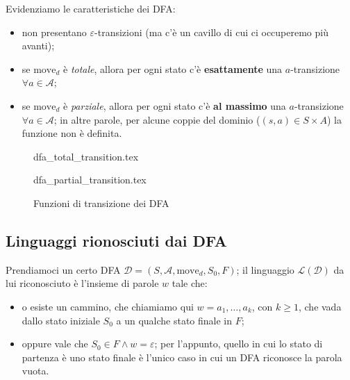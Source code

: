 \documentclass[class=book, crop=false, oneside, 12pt]{standalone}
\begin{document}
Evidenziamo le caratteristiche dei DFA:

\begin{itemize}
    \item non presentano \(\varepsilon\)-transizioni (ma c'è un cavillo di cui ci occuperemo più avanti);
    \item se \(\textrm{move}_d\) è \emph{totale}, allora per ogni stato c'è \textbf{esattamente} una \(a\)-transizione \(\forall a \in \mathcal{A}\);
    \item se \(\textrm{move}_d\) è \emph{parziale}, allora per ogni stato c'è \textbf{al massimo} una \(a\)-transizione \(\forall a \in \mathcal{A}\); in altre parole, per alcune coppie del dominio (\((s,a) \in S \times A\)) la funzione non è definita.
\end{itemize}

\begin{figure}[H]
    \begin{minipage}[b]{0.4\textwidth}
        \centering
        {dfa_total_transition.tex}
    \end{minipage}
    \hfill
    \begin{minipage}[b]{0.4\textwidth}
        \centering
        {dfa_partial_transition.tex}
    \end{minipage}
    \caption{Funzioni di transizione dei DFA}
\end{figure}

\subsection{Linguaggi rionosciuti dai DFA}
Prendiamoci un certo DFA \(\mathcal{D} = (S, \mathcal{A}, \textrm{move}_d, S_0, F)\); il linguaggio \(\mathcal{L(D)}\) da lui riconosciuto è l'insieme di parole \(w\) tale che:

\begin{itemize}
    \item o esiste un cammino, che chiamiamo qui \(w = a_1, \ldots, a_k\), con \(k \ge 1\), che vada dallo stato iniziale \(S_0\) a un qualche stato finale in \(F\);
    \item oppure vale che \(S_0 \in F \wedge w = \varepsilon\); per l'appunto, quello in cui lo stato di partenza è uno stato finale è l'unico caso in cui un DFA riconosce la parola vuota.
\end{itemize}
\end{document}
